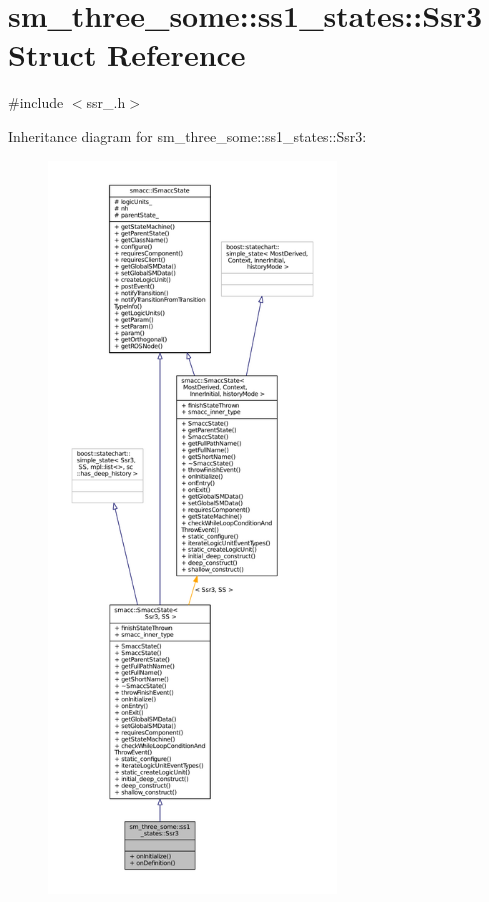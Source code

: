 \hypertarget{structsm__three__some_1_1ss1__states_1_1Ssr3}{}\section{sm\+\_\+three\+\_\+some\+:\+:ss1\+\_\+states\+:\+:Ssr3 Struct Reference}
\label{structsm__three__some_1_1ss1__states_1_1Ssr3}


{\ttfamily \#include $<$ssr\+\_.\+h$>$}



Inheritance diagram for sm\+\_\+three\+\_\+some\+:\+:ss1\+\_\+states\+:\+:Ssr3\+:
\nopagebreak
\begin{figure}[H]
\begin{center}
\leavevmode
\includegraphics[height=550pt]{structsm__three__some_1_1ss1__states_1_1Ssr3__inherit__graph}
\end{center}
\end{figure}


